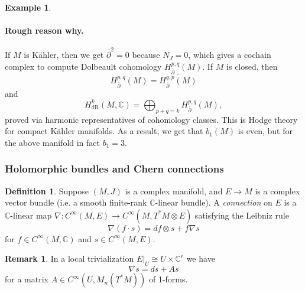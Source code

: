 \documentclass{article}
\theoremstyle{definition}
\newtheorem*{definition}{Definition}
\newtheorem*{example}{Example}
\newtheorem*{remark}{Remark}
\newcommand{\dR}{\mathrm{dR}}
\newcommand{\C}{\mathbb{C}}
\begin{document}
\begin{example}
\begin{itemize}
            \paragraph{Rough reason why.} If $M$ is K\"ahler, then we get
            $\bar\partial^2=0$ because $N_J=0$, which gives a cochain complex to
            compute Dolbeault cohomology $H^{p,q}_{\bar\partial}(M)$. If $M$ is
            closed, then
            \begin{equation*}
                H^{p,q}_{\bar\partial}(M)
                    = \overline{H^{q,p}_{\bar\partial}(M)}
            \end{equation*}
            and
            \begin{equation*}
                H^k_\dR(M,\C) = \bigoplus_{p+q=k}H^{p,q}_{\bar\partial}(M),
            \end{equation*}
            proved via harmonic representatives of cohomology classes. This is
            Hodge theory for compact K\"ahler manifolds. As a result, we get
            that $b_1(M)$ is even, but for the above manifold in fact $b_1=3$.
    \end{itemize}
\end{example}

\subsubsection*{Holomorphic bundles and Chern connections}

\begin{definition}
    Suppose $(M,J)$ is a complex manifold, and $E\to M$ is a complex vector
    bundle (i.e. a smooth finite-rank $\C$-linear bundle). A \emph{connection}
    on $E$ is a $\C$-linear map
    $\nabla:C^\infty(M,E)\to C^\infty(M,T^*M\otimes E)$ satisfying the Leibniz
    rule
    \begin{equation*}
        \nabla(f\cdot s) = df\otimes s + f\nabla s
    \end{equation*}
    for $f\in C^\infty(M,\C)$ and $s\in C^\infty(M,E)$.
\end{definition}

\begin{remark}
    In a local trivialization $E|_U\cong U\times\C^r$ we have
    \begin{equation*}
        \nabla s = ds + As
    \end{equation*}
    for a matrix $A\in C^\infty(U,M_n(T^*M))$ of 1-forms.
\end{remark}
\end{document}
